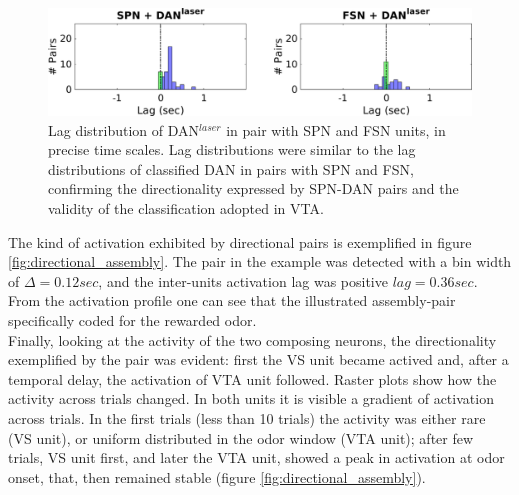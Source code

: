 \begin{figure}[H]
\centering
\includegraphics[scale=0.44]{figures/LagSecLaser3VS.pdf}
\caption{Lag distribution of DAN$^{laser}$ in pair with SPN and FSN units, in precise time scales. Lag distributions were similar to the lag distributions of classified DAN in pairs with SPN and FSN, confirming the directionality expressed by SPN-DAN pairs and the validity of the classification adopted in VTA.}
\label{fig:LagInSecLaser}
\end{figure}
The kind of activation exhibited by directional pairs is exemplified in figure \ref{fig:directional_assembly}. The pair in the example was detected with a bin width of $\Delta = 0.12 sec$, and the inter-units activation lag was positive $lag = 0.36 sec$. From the activation profile one can see that the illustrated assembly-pair specifically coded for the rewarded odor.\\Finally, looking at the activity of the two composing neurons, the directionality exemplified by the pair was evident: first the VS unit became actived and, after a temporal delay, the activation of VTA unit followed. Raster plots show how the activity across trials changed. In both units it is visible a gradient of activation across trials. In the first trials (less than 10 trials) the activity was either rare (VS unit), or uniform distributed in the odor window (VTA unit); after few trials, VS unit first, and later the VTA unit, showed a peak in activation at odor onset, that, then remained stable (figure \ref{fig:directional_assembly}).
